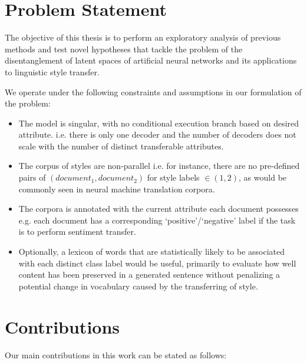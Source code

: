 \section{Problem Statement}

The objective of this thesis is to perform an exploratory analysis of previous methods and test novel hypotheses that tackle the problem of the disentanglement of latent spaces of artificial neural networks and its applications to linguistic style transfer.

We operate under the following constraints and assumptions in our formulation of the problem:

\begin{itemize}
	\item The model is singular, with no conditional execution branch based on desired attribute. i.e. there is only one decoder and the number of decoders does not scale with the number of distinct transferable attributes.
	\item The corpus of styles are non-parallel i.e. for instance, there are no pre-defined pairs of $(document_1, document_2)$ for style labels $\in (1, 2)$, as would be commonly seen in neural machine translation corpora.
	\item The corpora is annotated with the current attribute each document possesses e.g. each document has a corresponding `positive'/`negative' label if the task is to perform sentiment transfer.
	\item Optionally, a lexicon of words that are statistically likely to be associated with each distinct class label would be useful, primarily to evaluate how well content has been preserved in a generated sentence without penalizing a potential change in vocabulary caused by the transferring of style.
\end{itemize}


\section{Contributions}

Our main contributions in this work can be stated as follows:

